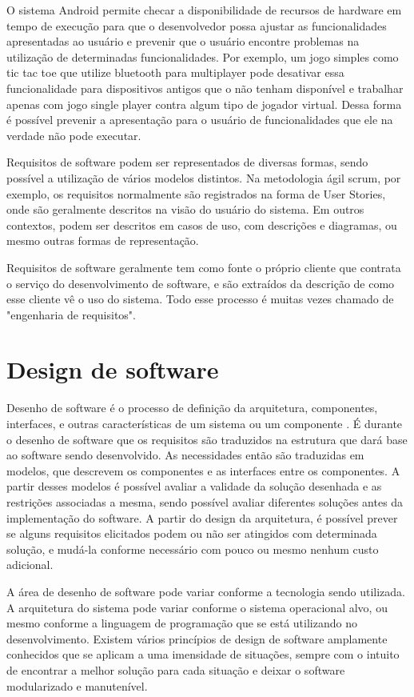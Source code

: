 O sistema Android permite checar a disponibilidade de recursos de hardware em tempo de execução para que o desenvolvedor possa ajustar as funcionalidades apresentadas ao usuário e prevenir que o usuário encontre problemas na utilização de determinadas funcionalidades. Por exemplo, um jogo simples como tic tac toe que utilize bluetooth para multiplayer pode desativar essa funcionalidade para dispositivos antigos que o não tenham disponível e trabalhar apenas com jogo single player contra algum tipo de jogador virtual. Dessa forma é possível prevenir a apresentação para o usuário de funcionalidades que ele na verdade não pode executar.

Requisitos de software podem ser representados de diversas formas, sendo possível a utilização de vários modelos distintos. Na metodologia ágil scrum, por exemplo, os requisitos normalmente são registrados na forma de User Stories, onde são geralmente descritos na visão do usuário do sistema. Em outros contextos, podem ser descritos em casos de uso, com descrições e diagramas, ou mesmo outras formas de representação.

Requisitos de software geralmente tem como fonte o próprio cliente que contrata o serviço do desenvolvimento de software, e são extraídos da descrição de como esse cliente vê o uso do sistema. Todo esse processo é muitas vezes chamado de "engenharia de requisitos".

\section{Design de software}

Desenho de software é o processo de definição da arquitetura, componentes, interfaces, e outras características de um sistema ou um componente \cite{swebok}. É durante o desenho de software que os requisitos são traduzidos na estrutura que dará base ao software sendo desenvolvido. As necessidades então são traduzidas em modelos, que descrevem os componentes e as interfaces entre os componentes. A partir desses modelos é possível avaliar a validade da solução desenhada e as restrições associadas a mesma, sendo possível avaliar diferentes soluções antes da implementação do software. A partir do design da arquitetura, é possível prever se alguns requisitos elicitados podem ou não ser atingidos com determinada solução, e mudá-la conforme necessário com pouco ou mesmo nenhum custo adicional.

A área de desenho de software pode variar conforme a tecnologia sendo utilizada. A arquitetura do sistema pode variar conforme o sistema operacional alvo, ou mesmo conforme a linguagem de programação que se está utilizando no desenvolvimento. Existem vários princípios de design de software amplamente conhecidos que se aplicam a uma imensidade de situações, sempre com o intuito de encontrar a melhor solução para cada situação e deixar o software modularizado e manutenível.


